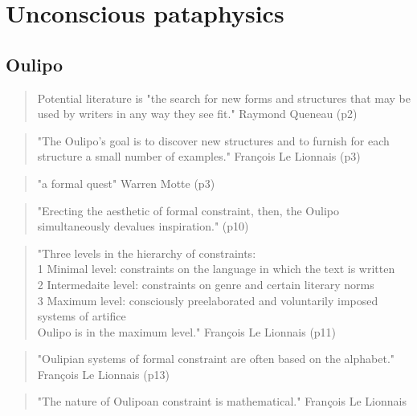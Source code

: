 \section{Unconscious pataphysics}

\subsection{Oulipo}


\begin{quote}
  Potential literature is "the search for new forms and structures that may be used by writers in any way they see fit." Raymond Queneau (p2)
\end{quote}

\begin{quote}
  "The Oulipo's goal is to discover new structures and to furnish for each structure a small number of examples." François Le Lionnais (p3)
\end{quote}

\begin{quote}
  "a formal quest" Warren Motte (p3)
\end{quote}

\begin{quote}
  "Erecting the aesthetic of formal constraint, then, the Oulipo simultaneously devalues inspiration." (p10)
\end{quote}

\begin{quote}
  "Three levels in the hierarchy of constraints:\\1 Minimal level: constraints on the language in which the text is written\\2 Intermedaite level: constraints on genre and certain literary norms\\3 Maximum level: consciously preelaborated and voluntarily imposed systems of artifice\\Oulipo is in the maximum level." François Le Lionnais (p11)
\end{quote}

\begin{quote}
  "Oulipian systems of formal constraint are often based on the alphabet." François Le Lionnais (p13)
\end{quote}

\begin{quote}
  "The nature of Oulipoan constraint is mathematical." François Le Lionnais
\end{quote}

